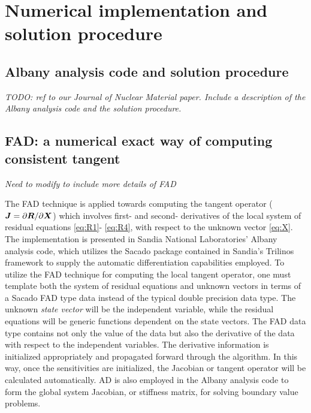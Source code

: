 \documentclass[11pt]{article}
\theoremstyle{remark}
\begin{document}
\section{Numerical implementation and solution procedure} \label{sec:implementation}

\subsection{Albany analysis code and solution procedure}
\textit{TODO: ref to our Journal of Nuclear Material paper. Include a 
description of the Albany analysis code and the solution procedure.}


\subsection{FAD: a numerical exact way of computing consistent tangent}                                                                     
\textit{Need to modify to include more details of FAD}

The FAD technique is applied towards computing the tangent operator ($
{\boldsymbol{J}} = \partial{\boldsymbol{R}} / \partial{\boldsymbol{X}}$) which involves first- and second-
derivatives of the local system of residual equations \eqref{eq:R1}-
\eqref{eq:R4}, with respect to the unknown vector \eqref{eq:X}. The 
implementation is presented in Sandia National Laboratories' Albany 
analysis code\cite{Salinger2013}, which utilizes the Sacado package 
contained in Sandia's Trilinos framework to supply the 
automatic differentiation capabilities employed. To utilize the FAD 
technique for computing the local tangent operator, one must template 
both the system of residual equations and unknown vectors in terms of 
a Sacado FAD type data instead of the typical double precision data 
type. The unknown {\em state vector} will be the independent 
variable,  while the residual equations will be generic functions 
dependent on  the state vectors. The FAD data type contains not only 
the value of the data but also the derivative of the data with 
respect to the independent variables. The derivative information is 
initialized appropriately and propagated forward through the 
algorithm. In this way, once the sensitivities are initialized, the 
Jacobian or tangent operator will be calculated automatically. AD is 
also employed in the Albany analysis code to form the global system 
Jacobian, or stiffness matrix, for solving boundary value problems.
\end{document}

